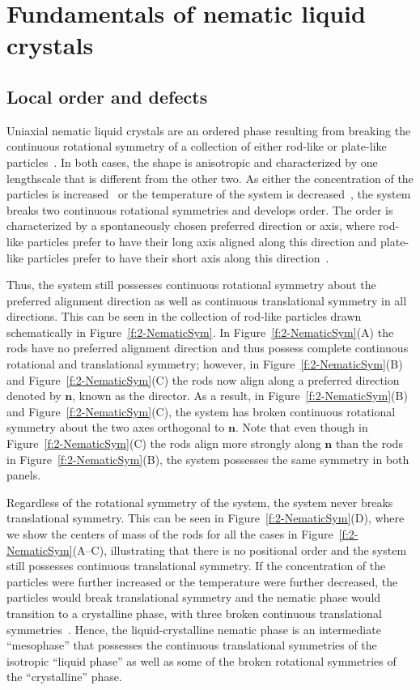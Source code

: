 \chapter{Fundamentals of nematic liquid crystals}\label{c:2}

\section{Local order and defects}
Uniaxial nematic liquid crystals are an ordered phase resulting from breaking the continuous rotational symmetry of a collection of either rod-like or plate-like particles~\cite{RN33}.
In both cases, the shape is anisotropic and characterized by one lengthscale that is different from the other two.
As either the concentration of the particles is increased~\cite{RN204} or the temperature of the system is decreased~\cite{RN202}, the system breaks two continuous rotational symmetries and develops order.
The order is characterized by a spontaneously chosen preferred direction or axis, where rod-like particles prefer to have their long axis aligned along this direction and plate-like particles prefer to have their short axis along this direction~\cite{RN33,RN175}.

Thus, the system still possesses continuous rotational symmetry about the preferred alignment direction as well as continuous translational symmetry in  all directions.
This can be seen in the collection of rod-like particles drawn schematically in Figure~\ref{f:2-NematicSym}.
In Figure~\ref{f:2-NematicSym}(A) the rods have no preferred alignment direction and thus possess complete continuous rotational and translational symmetry; however, in Figure~\ref{f:2-NematicSym}(B) and Figure~\ref{f:2-NematicSym}(C) the rods now align along a preferred direction denoted by $\mathbf{n}$, known as the director.
As a result, in Figure~\ref{f:2-NematicSym}(B) and Figure~\ref{f:2-NematicSym}(C), the system has broken continuous rotational symmetry about the two axes orthogonal to $\mathbf{n}$.
Note that even though in Figure~\ref{f:2-NematicSym}(C) the rods align more strongly along $\mathbf{n}$ than the rods in Figure~\ref{f:2-NematicSym}(B), the system possesses the same symmetry in both panels.

Regardless of the rotational symmetry of the system, the system never breaks translational symmetry.
This can be seen in Figure~\ref{f:2-NematicSym}(D), where we show the centers of mass of the rods for all the cases in Figure~\ref{f:2-NematicSym}(A--C), illustrating that there is no positional order and the system still possesses continuous translational symmetry.
If the concentration of the particles were further increased or the temperature were further decreased, the particles would break translational symmetry and the nematic phase would transition to a crystalline phase, with three broken continuous translational symmetries~\cite{RN33}.
Hence, the liquid-crystalline nematic phase is an intermediate ``mesophase'' that possesses the continuous translational symmetries of the isotropic ``liquid phase'' as well as some of the broken rotational symmetries of the ``crystalline'' phase.

